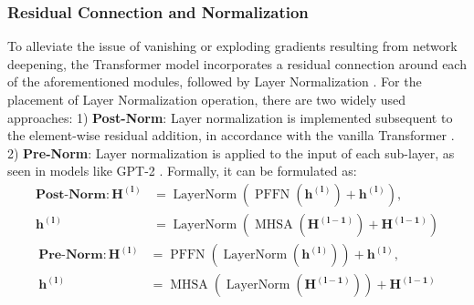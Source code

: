 \subsubsection{Residual Connection and Normalization}
To alleviate the issue of vanishing or exploding gradients resulting from network deepening, the Transformer model incorporates a residual connection \cite{he2016deep} around each of the aforementioned modules, followed by Layer Normalization \cite{ba2016layer}. 
For the placement of Layer Normalization operation, there are two widely used approaches:
1) \textbf{Post-Norm}: Layer normalization is implemented subsequent to the element-wise residual addition, in accordance with the vanilla Transformer \cite{vaswani2017attention}.
2) \textbf{Pre-Norm}: Layer normalization is applied to the input of each sub-layer, as seen in models like GPT-2 \cite{radford2019language}. 
Formally, it can be formulated as:
\begin{equation}
\begin{aligned}
\textbf{Post-Norm}: 
    \mathbf{H^{(l)}} &=\operatorname{LayerNorm}(\operatorname{PFFN}(\mathbf{h^{(l)}})+\mathbf{h^{(l)}}),\\
    \mathbf{h^{(l)}}&=\operatorname{LayerNorm}(\operatorname{MHSA}(\mathbf{H^{(l-1)}})+\mathbf{H^{(l-1)}}) 
\end{aligned}
\end{equation}
\begin{equation}
\begin{aligned}
\textbf{Pre-Norm}: 
    \mathbf{H^{(l)}} &=\operatorname{PFFN}(\operatorname{LayerNorm}(\mathbf{h^{(l)}}))+\mathbf{h^{(l)}},\\
    \mathbf{h^{(l)}}&=\operatorname{MHSA}(\operatorname{LayerNorm}(\mathbf{H^{(l-1)}}))+\mathbf{H^{(l-1)}} 
\end{aligned}
\end{equation}
